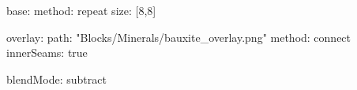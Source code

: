 base:
  method: repeat
  size: [8,8]

overlay:
  path: "Blocks/Minerals/bauxite_overlay.png"
  method: connect
  innerSeams: true

blendMode: subtract

